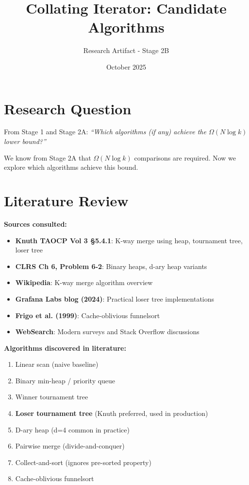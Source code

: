 \documentclass[11pt]{article}
\title{Collating Iterator: Candidate Algorithms}
\author{Research Artifact - Stage 2B}
\date{October 2025}
\begin{document}
\maketitle

\section{Research Question}

From Stage 1 and Stage 2A: \textit{``Which algorithms (if any) achieve the $\Omega(N \log k)$ lower bound?''}

We know from Stage 2A that $\Omega(N \log k)$ comparisons are required. Now we explore which algorithms achieve this bound.

\section{Literature Review}

\textbf{Sources consulted:}
\begin{itemize}
    \item \textbf{Knuth TAOCP Vol 3 §5.4.1}: K-way merge using heap, tournament tree, loser tree
    \item \textbf{CLRS Ch 6, Problem 6-2}: Binary heaps, d-ary heap variants
    \item \textbf{Wikipedia}: K-way merge algorithm overview
    \item \textbf{Grafana Labs blog (2024)}: Practical loser tree implementations
    \item \textbf{Frigo et al. (1999)}: Cache-oblivious funnelsort
    \item \textbf{WebSearch}: Modern surveys and Stack Overflow discussions
\end{itemize}

\textbf{Algorithms discovered in literature:}
\begin{enumerate}
    \item Linear scan (naive baseline)
    \item Binary min-heap / priority queue
    \item Winner tournament tree
    \item \textbf{Loser tournament tree} (Knuth preferred, used in production)
    \item D-ary heap (d=4 common in practice)
    \item Pairwise merge (divide-and-conquer)
    \item Collect-and-sort (ignores pre-sorted property)
    \item Cache-oblivious funnelsort
\end{enumerate}
\end{document}
